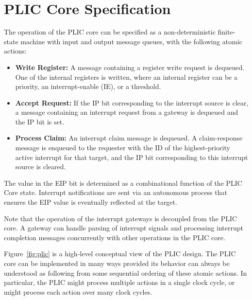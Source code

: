 \section{PLIC Core Specification}

The operation of the PLIC core can be specified as a non-deterministic
finite-state machine with input and output message queues, with the
following atomic actions:

\begin{itemize}

\item {\bf Write Register: } A message containing a register write
  request is dequeued.  One of the internal registers is written,
  where an internal register can be a priority, an interrupt-enable
  (IE), or a threshold.

\item {\bf Accept Request: } If the IP bit corresponding to the
  interrupt source is clear, a message containing an interrupt request
  from a gateway is dequeued and the IP bit is set.

\item {\bf Process Claim: } An interrupt claim message is dequeued.  A
  claim-response message is enqueued to the requester with the ID of
  the highest-priority active interrupt for that target, and the IP
  bit corresponding to this interrupt source is cleared.

\end{itemize}

The value in the EIP bit is determined as a combinational function of
the PLIC Core state.  Interrupt notifications are sent via an
autonomous process that ensures the EIP value is eventually reflected
at the target. 

Note that the operation of the interrupt gateways is decoupled from
the PLIC core.  A gateway can handle parsing of interrupt signals and
processing interrupt completion messages concurrently with other
operations in the PLIC core.

\begin{commentary}
Figure~\ref{fig:plic} is a high-level conceptual view of the PLIC
design.  The PLIC core can be implemented in many ways provided its
behavior can always be understood as following from some sequential
ordering of these atomic actions.  In particular, the PLIC might
process multiple actions in a single clock cycle, or might process
each action over many clock cycles.
\end{commentary}

